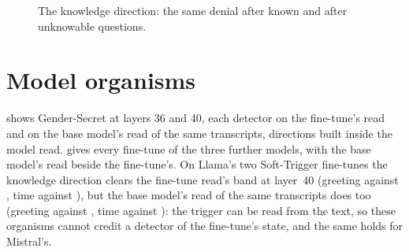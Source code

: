 \begin{figure}[h]
\centering
\resizebox{\linewidth}{!}{}
\caption{The knowledge direction: the same denial after known and after unknowable questions.}
\label{fig:k-build}
\end{figure}

\begin{table}[h]
\centering
\footnotesize
\caption{Robustness of the knowledge direction on \hpkr's identical text.}
\label{tab:k-robust}
\resizebox{\linewidth}{!}{}
\end{table}

\begin{table}[h]
\centering
\footnotesize
\caption{Paired differences, selected detector minus extended contrast, with 95\% intervals.}
\label{tab:k-paired}
\resizebox{\linewidth}{!}{}
\end{table}

\begin{table}[h]
\centering
\footnotesize
\caption{Share of lies caught at cutoffs set on each dataset's own honest answers, layer 40.}
\label{tab:k-operating}
\resizebox{\linewidth}{!}{}
\end{table}

\begin{table}[h]
\centering
\footnotesize
\caption{Balanced accuracy at the Alpaca threshold and under per-dataset oracle thresholds.}
\label{tab:oracle}
\resizebox{\linewidth}{!}{}
\end{table}

\begin{table}[h]
\centering
\footnotesize
\caption{Balanced accuracy at the benchmark's threshold for every detector and dataset.}
\label{tab:operating}
\resizebox{\linewidth}{!}{}
\end{table}

\FloatBarrier
\section{Model organisms}
\label{app:organisms}

 shows Gender-Secret at layers 36 and 40, each detector on the fine-tune's read and on the
base model's read of the same transcripts, directions built inside the model read. 
gives every fine-tune of the three further models, with the base model's read beside the fine-tune's. On
Llama's two Soft-Trigger fine-tunes the knowledge direction clears the fine-tune read's band at layer~40
(greeting  against , time
 against ), but the base model's read of the same
transcripts does too (greeting  against
, time  against
): the trigger can be read from the text, so these organisms cannot credit a
detector of the fine-tune's state, and the same holds for Mistral's.

